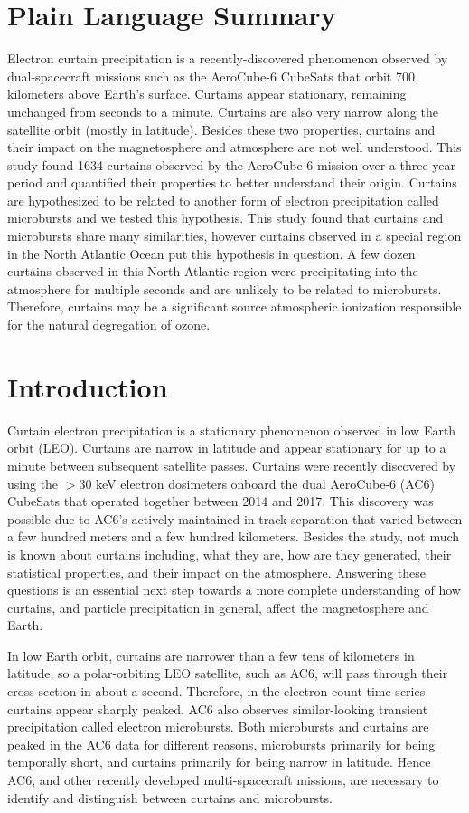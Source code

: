 \documentclass[draft]{agujournal2019}
\begin{document}
\section{Plain Language Summary}
Electron curtain precipitation is a recently-discovered phenomenon observed by dual-spacecraft missions such as the AeroCube-6 CubeSats that orbit 700 kilometers above Earth's surface. Curtains appear stationary, remaining unchanged from seconds to a minute. Curtains are also very narrow along the satellite orbit (mostly in latitude). Besides these two properties, curtains and their impact on the magnetosphere and atmosphere are not well understood. This study found 1634 curtains observed by the AeroCube-6 mission over a three year period and quantified their properties to better understand their origin. Curtains are hypothesized to be related to another form of electron precipitation called microbursts and we tested this hypothesis. This study found that curtains and microbursts share many similarities, however curtains observed in a special region in the North Atlantic Ocean put this hypothesis in question. A few dozen curtains observed in this North Atlantic region were precipitating into the atmosphere for multiple seconds and are unlikely to be related to microbursts. Therefore, curtains may be a significant source atmospheric ionization responsible for the natural degregation of ozone.

\section{Introduction}
Curtain electron precipitation is a stationary phenomenon observed in low Earth orbit (LEO). Curtains are narrow in latitude and appear stationary for up to a minute between subsequent satellite passes. Curtains were recently discovered by  using the $> 30$ keV electron dosimeters onboard the dual AeroCube-6 (AC6) CubeSats that operated together between 2014 and 2017. This discovery was possible due to AC6's actively maintained in-track separation that varied between a few hundred meters and a few hundred kilometers. Besides the  study, not much is known about curtains including, what they are, how are they generated, their statistical properties, and their impact on the atmosphere. Answering these questions is an essential next step towards a more complete understanding of how curtains, and particle precipitation in general, affect the magnetosphere and Earth.

In low Earth orbit, curtains are narrower than a few tens of kilometers in latitude, so a polar-orbiting LEO satellite, such as AC6, will pass through their cross-section in about a second. Therefore, in the electron count time series curtains appear sharply peaked. AC6 also observes similar-looking transient precipitation called electron microbursts. Both microbursts and curtains are peaked in the AC6 data for different reasons, microbursts primarily for being temporally short, and curtains primarily for being narrow in latitude. Hence AC6, and other recently developed multi-spacecraft missions, are necessary to identify and distinguish between curtains and microbursts.
\end{document}
